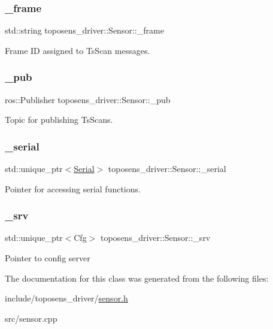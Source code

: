 \subsubsection{\texorpdfstring{\+\_\+frame}{\_frame}}
{\footnotesize\ttfamily std\+::string toposens\+\_\+driver\+::\+Sensor\+::\+\_\+frame\hspace{0.3cm}{\ttfamily [private]}}

Frame ID assigned to Ts\+Scan messages. \mbox{\label{classtoposens__driver_1_1Sensor_ac18f0d9e465c022a615d526207ff84f3}} 
\subsubsection{\texorpdfstring{\+\_\+pub}{\_pub}}
{\footnotesize\ttfamily ros\+::\+Publisher toposens\+\_\+driver\+::\+Sensor\+::\+\_\+pub\hspace{0.3cm}{\ttfamily [private]}}

Topic for publishing Ts\+Scans. \mbox{\label{classtoposens__driver_1_1Sensor_a202083580774286223129fd84ead26af}} 
\subsubsection{\texorpdfstring{\+\_\+serial}{\_serial}}
{\footnotesize\ttfamily std\+::unique\+\_\+ptr$<$\hyperlink{classtoposens__driver_1_1Serial}{Serial}$>$ toposens\+\_\+driver\+::\+Sensor\+::\+\_\+serial\hspace{0.3cm}{\ttfamily [private]}}

Pointer for accessing serial functions. \mbox{\label{classtoposens__driver_1_1Sensor_a02f9c1b78374f7958c14260e9fecac70}} 
\subsubsection{\texorpdfstring{\+\_\+srv}{\_srv}}
{\footnotesize\ttfamily std\+::unique\+\_\+ptr$<$Cfg$>$ toposens\+\_\+driver\+::\+Sensor\+::\+\_\+srv\hspace{0.3cm}{\ttfamily [private]}}

Pointer to config server 

The documentation for this class was generated from the following files\+:\begin{DoxyCompactItemize}
\item 
include/toposens\+\_\+driver/\hyperlink{sensor_8h}{sensor.\+h}\item 
src/sensor.\+cpp\end{DoxyCompactItemize}
